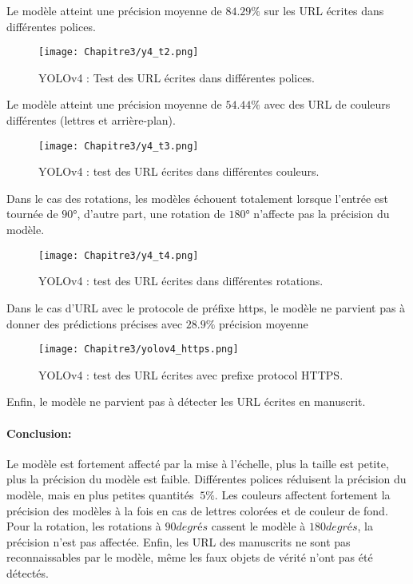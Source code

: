           Le modèle atteint une précision moyenne de $84.29\%$ sur les URL écrites dans différentes polices.
          \begin{figure}[H]
                    \centering
                    \texttt{[image: Chapitre3/y4\_t2.png]}
                    \caption{YOLOv4 : Test des URL écrites dans différentes polices.}
                    \label{y4_t2}
                    \end{figure}

          Le modèle atteint une précision moyenne de $54.44\%$ avec des URL de couleurs différentes (lettres et arrière-plan).
          \begin{figure}[H]
                    \centering
                    \texttt{[image: Chapitre3/y4\_t3.png]}
                    \caption{YOLOv4 : test des URL écrites dans différentes couleurs.}
                    \label{y4_t3}
                    \end{figure}

          Dans le cas des rotations, les modèles échouent totalement lorsque l'entrée est tournée de $90°$, d'autre part, une rotation de $180°$ n'affecte pas la précision du modèle.
          \begin{figure}[H]
                    \centering
                    \texttt{[image: Chapitre3/y4\_t4.png]}
                    \caption{YOLOv4 : test des URL écrites dans différentes rotations.}
                    \label{y4_t4}
                    \end{figure}
               
          Dans le cas d'URL avec le protocole de préfixe https, le modèle ne parvient pas à donner des prédictions précises avec $28.9\%$ précision moyenne
          \begin{figure}[H]
                    \centering
                    \texttt{[image: Chapitre3/yolov4\_https.png]}
                    \caption{YOLOv4 : test des URL écrites avec prefixe protocol HTTPS.}
                    \label{y4_https}
                    \end{figure}
               
          Enfin, le modèle ne parvient pas à détecter les URL écrites en manuscrit.
          \paragraph{Conclusion:} Le modèle est fortement affecté par la mise à l'échelle, plus la taille est petite, plus la précision du modèle est faible. Différentes polices réduisent la précision du modèle, mais en plus petites quantités $~ 5\%$. Les couleurs affectent fortement la précision des modèles à la fois en cas de lettres colorées et de couleur de fond. Pour la rotation, les rotations à $90 degrés$ cassent le modèle à $180 degrés$, la précision n'est pas affectée. Enfin, les URL des manuscrits ne sont pas reconnaissables par le modèle, même les faux objets de vérité n'ont pas été détectés.
               
